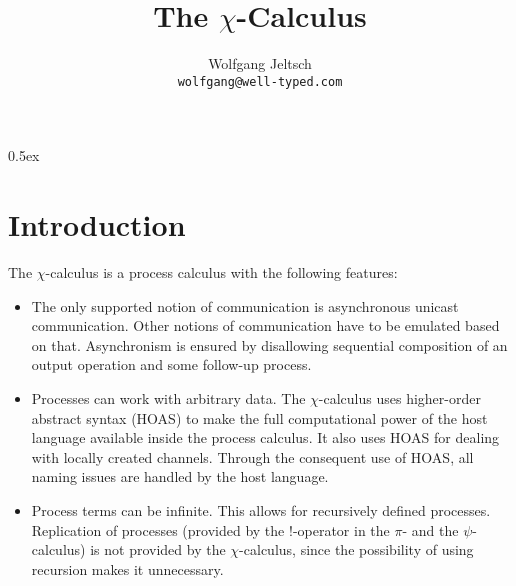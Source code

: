 \documentclass[a4paper,11pt]{article}
\begin{document}
\title{The $\chi$-Calculus}
\author{Wolfgang Jeltsch\\\small\texttt{wolfgang@well-typed.com}}

\maketitle

\tableofcontents

\parindent 0pt\parskip 0.5ex

\section{Introduction}

The $\chi$-calculus is a process calculus with the following features:
\begin{itemize}

\item

The only supported notion of communication is asynchronous unicast communication. Other notions of
communication have to be emulated based on that. Asynchronism is ensured by disallowing sequential
composition of an output operation and some follow-up process.

\item

Processes can work with arbitrary data. The $\chi$-calculus uses higher-order abstract syntax (HOAS)
to make the full computational power of the host language available inside the process calculus. It
also uses HOAS for dealing with locally created channels. Through the consequent use of HOAS, all
naming issues are handled by the host language.

\item

Process terms can be infinite. This allows for recursively defined processes. Replication of
processes (provided by the $!$-operator in the $\pi$- and the $\psi$-calculus) is not provided by
the $\chi$-calculus, since the possibility of using recursion makes it unnecessary.

\end{itemize}


\end{document}
